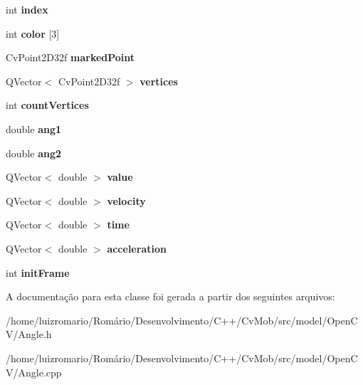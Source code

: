 \begin{DoxyCompactItemize}
\item 
\hypertarget{classAngle_ad1714d4131c99e55870e95899968dcb0}{
int {\bfseries index}}
\label{classAngle_ad1714d4131c99e55870e95899968dcb0}

\item 
\hypertarget{classAngle_a757d6e2314311ce9537f7f0831b1bd4b}{
int {\bfseries color} \mbox{[}3\mbox{]}}
\label{classAngle_a757d6e2314311ce9537f7f0831b1bd4b}

\item 
\hypertarget{classAngle_ad92282b2bbb8a7d1ee9523d7c99fe55c}{
CvPoint2D32f {\bfseries markedPoint}}
\label{classAngle_ad92282b2bbb8a7d1ee9523d7c99fe55c}

\item 
\hypertarget{classAngle_a12101facc34126f3622e99ff2e08bc38}{
QVector$<$ CvPoint2D32f $>$ {\bfseries vertices}}
\label{classAngle_a12101facc34126f3622e99ff2e08bc38}

\item 
\hypertarget{classAngle_ae429845206518a493f61093592c35e19}{
int {\bfseries countVertices}}
\label{classAngle_ae429845206518a493f61093592c35e19}

\item 
\hypertarget{classAngle_a743d8e182082a96727f184fdd761aef4}{
double {\bfseries ang1}}
\label{classAngle_a743d8e182082a96727f184fdd761aef4}

\item 
\hypertarget{classAngle_a5546ad25d88b8e7c83851e03e58e02e8}{
double {\bfseries ang2}}
\label{classAngle_a5546ad25d88b8e7c83851e03e58e02e8}

\item 
\hypertarget{classAngle_ad15e4a83f28b05d3deacf1c4189cd900}{
QVector$<$ double $>$ {\bfseries value}}
\label{classAngle_ad15e4a83f28b05d3deacf1c4189cd900}

\item 
\hypertarget{classAngle_ac46ca515314e708e2122575f0e6a232b}{
QVector$<$ double $>$ {\bfseries velocity}}
\label{classAngle_ac46ca515314e708e2122575f0e6a232b}

\item 
\hypertarget{classAngle_a96b2711867149e4dee85107757bd9cd2}{
QVector$<$ double $>$ {\bfseries time}}
\label{classAngle_a96b2711867149e4dee85107757bd9cd2}

\item 
\hypertarget{classAngle_a3167a68a057586c5c3d92127700032d9}{
QVector$<$ double $>$ {\bfseries acceleration}}
\label{classAngle_a3167a68a057586c5c3d92127700032d9}

\item 
\hypertarget{classAngle_ab06b27256e6503b1c6d3b2dc11694a1e}{
int {\bfseries initFrame}}
\label{classAngle_ab06b27256e6503b1c6d3b2dc11694a1e}

\end{DoxyCompactItemize}


A documentação para esta classe foi gerada a partir dos seguintes arquivos:\begin{DoxyCompactItemize}
\item 
/home/luizromario/Romário/Desenvolvimento/C++/CvMob/src/model/OpenCV/Angle.h\item 
/home/luizromario/Romário/Desenvolvimento/C++/CvMob/src/model/OpenCV/Angle.cpp\end{DoxyCompactItemize}
